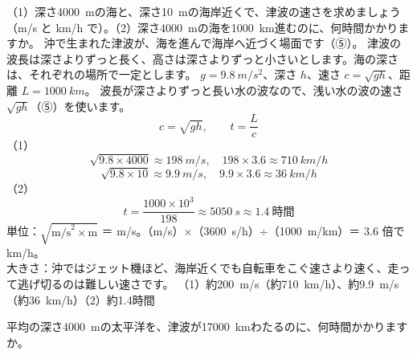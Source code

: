 \label{ph:波-5:ex10}
\begin{phreidai}[津波の速さ]
（1）深さ\qty{4000}{m}の海と、深さ\qty{10}{m}の海岸近くで、津波の速さを求めましょう（m/s と km/h で）。（2）深さ\qty{4000}{m}の海を\qty{1000}{km}進むのに、何時間かかりますか。
\phbamen
沖で生まれた津波が、海を進んで海岸へ近づく場面です（⑤）。
\phmushi
津波の波長は深さよりずっと長く、高さは深さよりずっと小さいとします。海の深さは、それぞれの場所で一定とします。
\phzu
$g=\qty{9.8}{m/s^2}$、深さ $h$、速さ $c=\sqrt{gh}$、距離 $L=\qty{1000}{km}$。
\phriyu
波長が深さよりずっと長い水の波なので、浅い水の波の速さ $\sqrt{gh}$（⑤）を使います。
\phtateru
\[c=\sqrt{gh},\qquad t=\frac{L}{c}\]
\phtoku
（1）\[\sqrt{9.8\times4000}\approx\qty{198}{m/s},\quad 198\times3.6\approx\qty{710}{km/h}\]
\[\sqrt{9.8\times10}\approx\qty{9.9}{m/s},\quad 9.9\times3.6\approx\qty{36}{km/h}\]
（2）\[t=\frac{1000\times10^3}{198}\approx\qty{5050}{s}\approx1.4\ \text{時間}\]
\phtashikame
単位：$\sqrt{\text{m/s}^2\times\text{m}}$ ＝ m/s。（m/s）×（\qty{3600}{s/h}）÷（\qty{1000}{m/km}）＝ 3.6 倍で km/h。\\
大きさ：沖ではジェット機ほど、海岸近くでも自転車をこぐ速さより速く、走って逃げ切るのは難しい速さです。
\kotae （1）約\qty{200}{m/s}（約\qty{710}{km/h}）、約\qty{9.9}{m/s}（約\qty{36}{km/h}）（2）約1.4時間
\end{phreidai}
\begin{jibun}
平均の深さ\qty{4000}{m}の太平洋を、津波が\qty{17000}{km}わたるのに、何時間かかりますか。
\end{jibun}

